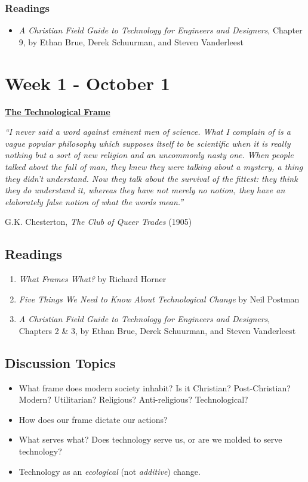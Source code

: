 \documentclass[12pt]{article}
\let\oldsection\section
\renewcommand\section{\clearpage\oldsection}
\begin{document}
\subsubsection*{Readings}
\label{sec:orgabf0597}
\begin{itemize}
\item \emph{A Christian Field Guide to Technology for Engineers and Designers}, Chapter
9, by Ethan Brue, Derek Schuurman, and Steven Vanderleest
\end{itemize}
\section*{Week 1 - October 1}
\label{sec:org830fbe1}
\begin{center}
\large \textbf{\uline{The Technological Frame}}
\end{center}
\begin{mdframed}
\emph{``I never said a word against eminent men of science. What I complain of is a
vague popular philosophy which supposes itself to be scientific when it is
really nothing but a sort of new religion and an uncommonly nasty one. When
people talked about the fall of man, they knew they were talking about a
mystery, a thing they didn’t understand. Now they talk about the survival of the
fittest: they think they do understand it, whereas they have not merely no
notion, they have an elaborately false notion of what the words mean.''}

\hfill G.K. Chesterton, \emph{The Club of Queer Trades} (1905)
\end{mdframed}
\subsection*{Readings}
\label{sec:orgd094db2}
\begin{enumerate}
\item \emph{What Frames What?} by Richard Horner
\item \emph{Five Things We Need to Know About Technological Change} by Neil Postman
\item \emph{A Christian Field Guide to Technology for Engineers and Designers}, Chapters
2 \& 3, by Ethan Brue, Derek Schuurman, and Steven Vanderleest
\end{enumerate}
\subsection*{Discussion Topics}
\label{sec:orgf1b0d07}
\begin{itemize}
\item What frame does modern society inhabit? Is it Christian? Post-Christian?
Modern? Utilitarian? Religious? Anti-religious? Technological?
\item How does our frame dictate our actions?
\item What serves what? Does technology serve us, or are we molded to serve
technology?
\item Technology as an \emph{ecological} (not \emph{additive}) change.
\end{itemize}
\end{document}
